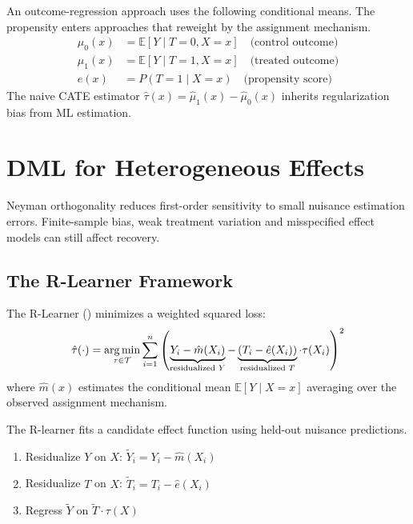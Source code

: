 \begin{definition}
\label{def:cate_nuisance}
An outcome-regression approach uses the following conditional means. The propensity enters approaches that reweight by the assignment mechanism.
\begin{align}
\mu_0(x) &= \mathbb{E}[Y \mid T = 0, X = x] \quad \text{(control outcome)} \\
\mu_1(x) &= \mathbb{E}[Y \mid T = 1, X = x] \quad \text{(treated outcome)} \\
e(x) &= P(T = 1 \mid X = x) \quad \text{(propensity score)}
\end{align}
The naive CATE estimator $\hat{\tau}(x) = \hat{\mu}_1(x) - \hat{\mu}_0(x)$ inherits regularization bias from ML estimation.
\end{definition}


\section{DML for Heterogeneous Effects}\label{sec:ch09_dml_heterogeneity}

Neyman orthogonality reduces first-order sensitivity to small nuisance estimation errors. Finite-sample bias, weak treatment variation and misspecified effect models can still affect recovery.

\subsection{The R-Learner Framework}

\begin{definition}
\label{def:r_learner}
The R-Learner (\cite{nie2021quasi}) minimizes a weighted squared loss:
\begin{equation}
\hat{\tau}(\cdot) = \operatorname*{arg\,min}_{\tau \in \mathcal{T}} \sum_{i=1}^{n} \left( \underbrace{Y_i - \hat{m}(X_i)}_{\text{residualized } Y} - \underbrace{(T_i - \hat{e}(X_i))}_{\text{residualized } T} \cdot \tau(X_i) \right)^2
\label{eq:r_learner}
\end{equation}
where $\hat{m}(x)$ estimates the conditional mean $\mathbb{E}[Y \mid X=x]$ averaging over the observed assignment mechanism.
\end{definition}

The R-learner fits a candidate effect function using held-out nuisance predictions.
\begin{enumerate}
    \item Residualize $Y$ on $X$: $\tilde{Y}_i = Y_i - \hat{m}(X_i)$
    \item Residualize $T$ on $X$: $\tilde{T}_i = T_i - \hat{e}(X_i)$
    \item Regress $\tilde{Y}$ on $\tilde{T} \cdot \tau(X)$
\end{enumerate}

